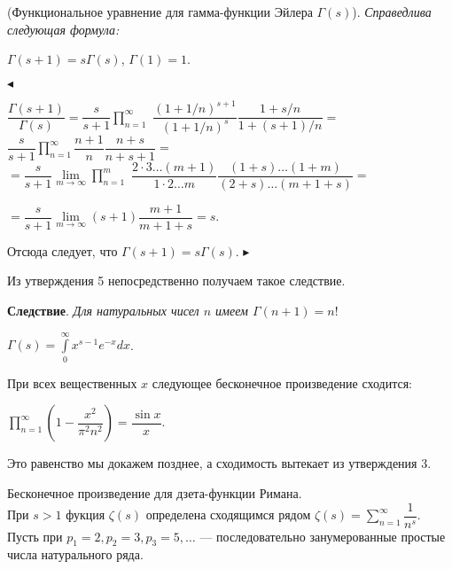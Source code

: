 \begin{approval}
(Функциональное уравнение для гамма-функции Эйлера $\Gamma(s)$). \slshape{Справедлива следующая формула:}
\begin{center}
$\Gamma(s + 1) = s\Gamma(s)$,  $\Gamma(1) = 1$.
\end{center}
\end{approval}

$\blacktriangleleft$\upshape\mdseries{}
\begin{center}
$\dfrac{\Gamma(s + 1)}{\Gamma(s)} = \dfrac{s}{s + 1}\prod\limits_{n=1}^{\infty}$
$\dfrac{(1 + 1/n)^{s + 1}}{(1 + 1/n)^{s}}\dfrac{1 + s/n}{1 + (s + 1)/n}=$
$\dfrac{s}{s + 1}\prod\limits_{n=1}^{\infty}\dfrac{n + 1}{n}\dfrac{n + s}{n + s + 1}=$\\
$=\dfrac{s}{s + 1}\lim\limits_{m\to\infty}\prod\limits_{n=1}^{m}$
$\dfrac{2\cdot 3\ldots(m + 1)}{1\cdot 2\ldots m}\dfrac{(1 + s)\ldots(1 + m)}{(2 + s)\ldots(m + 1 + s)} =$

$=\dfrac{s}{s + 1}\lim\limits_{m\to\infty}(s + 1)\dfrac{m + 1}{m + 1 + s} = s$.
\end{center}
Отсюда следует, что $\Gamma(s + 1) = s\Gamma(s)$. $\blacktriangleright$

Из утверждения 5 непосредственно получаем такое следствие.


\textbf{Следствие}. \slshape{Для натуральных чисел $n$ имеем $\Gamma(n + 1) = n!$ }
\upshape\mdseries{}
\begin{center}
$\Gamma(s) = \int\limits_{0}^{\infty} x^{s - 1} e^{-x}dx$.
\end{center} 

\begin{example}
При всех вещественных $x$ следующее бесконечное произведение сходится:
\begin{center}
$\prod\limits_{n=1}^{\infty}\left(1 - \dfrac{x^2}{\pi^2 n^2}\right) = \dfrac{\sin x}{x}$.
\end{center}
\end{example}

Это равенство мы докажем позднее, а сходимость вытекает из утверждения 3.

\begin{example}
Бесконечное произведение для дзета-функции Римана. \\ При $s>1$ фукция $\zeta(s)$ определена сходящимся рядом 
$\zeta(s) = \sum\limits_{n=1}^{\infty}\dfrac{1}{n^s}$. Пусть при $p_1 = 2, p_2 = 3, p_3 = 5, \ldots$ --- последовательно
занумерованные простые числа натурального ряда.
\end{example}

